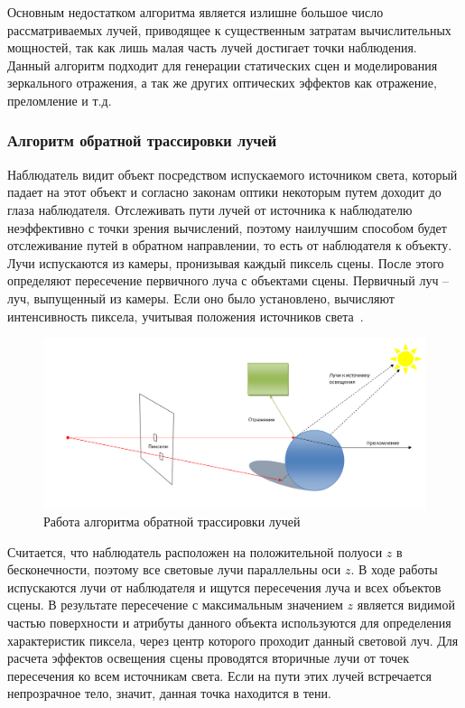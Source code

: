 Основным недостатком алгоритма является излишне большое число рассматриваемых лучей, приводящее к существенным затратам вычислительных мощностей, так как лишь малая часть лучей достигает точки наблюдения.
Данный алгоритм подходит для генерации статических сцен и моделирования зеркального отражения, а так же других оптических эффектов как отражение, преломление и т.д.

\subsubsection{Алгоритм обратной трассировки лучей}

Наблюдатель видит объект посредством испускаемого источником света,
который падает на этот объект и согласно законам оптики некоторым путем доходит до глаза наблюдателя. Отслеживать пути лучей от источника к наблюдателю неэффективно с точки зрения вычислений, поэтому наилучшим способом будет отслеживание путей в обратном направлении, то есть от наблюдателя к объекту. 
Лучи испускаются из камеры, пронизывая каждый пиксель сцены. 
После этого определяют пересечение первичного луча с объектами сцены. 
Первичный луч – луч, выпущенный из камеры. 
Если оно было установлено, вычисляют интенсивность пиксела, учитывая положения источников света~\cite{roders, ray-tracing}.

\begin{figure}[h]
	\centering
	\includegraphics[height=0.25\textheight]{img/reverse-ray-tracing.png}
	\caption{Работа алгоритма обратной трассировки лучей}
	\label{img:rray-tracing}
\end{figure}

Считается, что наблюдатель расположен на положительной полуоси $z$ в бесконечности, поэтому все световые лучи параллельны оси $z$. 
В ходе работы испускаются лучи от наблюдателя и ищутся пересечения луча и всех объектов сцены. 
В результате пересечение с максимальным значением $z$ является видимой частью поверхности и атрибуты данного объекта используются для определения характеристик пиксела, через центр которого проходит данный
световой луч.
Для расчета эффектов освещения сцены проводятся вторичные лучи от точек пересечения ко всем источникам света. Если на пути этих лучей встречается непрозрачное тело, значит, данная точка находится в тени.

